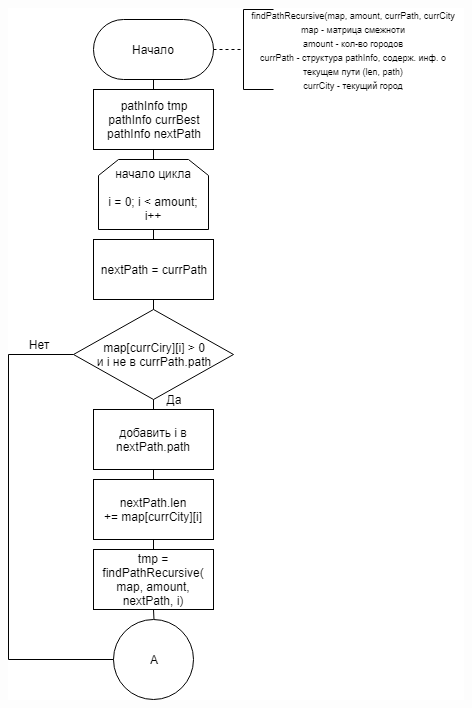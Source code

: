 \documentclass[12pt]{report}
\begin{document}
	\begin{center}
		\includegraphics[scale=0.7]{Rec1.png}
		

\end{center}
\end{document}
